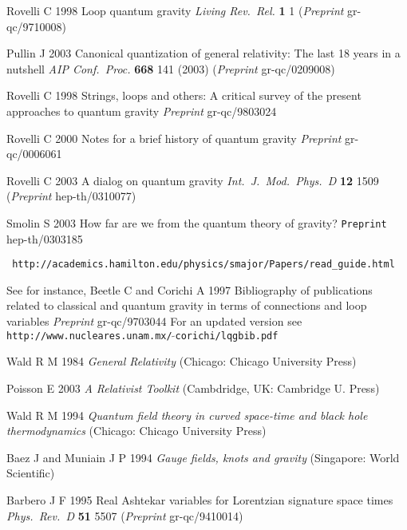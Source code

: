 \documentclass[aps,prd,tightenlines,showpacs,nofootinbib,preprint]{revtex4}
\begin{document}
\begin{thebibliography}{99}
  Rovelli C 1998
  Loop quantum gravity {\it Living Rev.\ Rel.}  {\bf 1} 1
  ({\it Preprint} gr-qc/9710008)


 Pullin J 2003
  Canonical quantization of general relativity: The last 18 years in a
  nutshell {\it AIP Conf.\ Proc.}  {\bf 668} 141 (2003)
  ({\it Preprint} gr-qc/0209008)

Rovelli C 1998 Strings, loops and others: A critical survey
  of the present approaches to quantum gravity
  {\it Preprint} gr-qc/9803024

  Rovelli C 2000
  Notes for a brief history of quantum gravity
  {\it Preprint} gr-qc/0006061

  Rovelli C 2003  A dialog on quantum gravity
  {\it Int.\ J.\ Mod.\ Phys.\ D} {\bf 12} 1509
  ({\it Preprint} hep-th/0310077)

  Smolin S 2003 How far are we from the quantum theory of gravity?
  {\tt Preprint} hep-th/0303185

{\tt
http://academics.hamilton.edu/physics/smajor/Papers/read\_guide.html}

 See for instance, Beetle C and Corichi A 1997
Bibliography of publications related to classical and quantum
gravity in terms of connections and loop variables {\it Preprint}
gr-qc/9703044
 For an updated version see {\tt
http://www.nucleares.unam.mx/$\;\tilde{ }$corichi/lqgbib.pdf}

 Wald R M 1984 {\it General Relativity}
(Chicago: Chicago University Press)

 Poisson E 2003 {\it A Relativist Toolkit} (Cambdridge,
UK: Cambridge U. Press)

 Wald R M 1994
{\it Quantum field theory in curved space-time and black hole
thermodynamics} (Chicago: Chicago University Press)

 Baez J and Muniain J P 1994
{\it Gauge fields, knots and gravity}
(Singapore: World Scientific)

 Barbero J F 1995
  Real Ashtekar variables for Lorentzian signature space times
  {\it Phys.\ Rev.\ D} {\bf 51} 5507
  ({\it Preprint} gr-qc/9410014)


\end{thebibliography}
\end{document}
